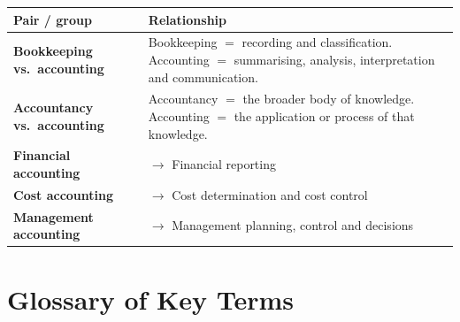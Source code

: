 \documentclass[11pt,a4paper]{article}
\begin{document}
\begin{center}
\small
\begin{tabularx}{\textwidth}{@{}l Y@{}}
\toprule
{}\textbf{Pair / group} & \textbf{Relationship}\\
\midrule
\textbf{Bookkeeping vs.\ accounting} & Bookkeeping $=$ recording and classification.\; Accounting $=$ summarising, analysis, interpretation and communication.\\
\textbf{Accountancy vs.\ accounting} & Accountancy $=$ the broader body of knowledge.\; Accounting $=$ the application or process of that knowledge.\\
\textbf{Financial accounting} & $\rightarrow$ Financial reporting\\
\textbf{Cost accounting} & $\rightarrow$ Cost determination and cost control\\
\textbf{Management accounting} & $\rightarrow$ Management planning, control and decisions\\
\bottomrule
\end{tabularx}
\end{center}

\section{Glossary of Key Terms}
\end{document}
